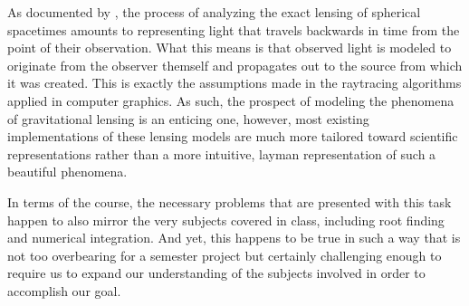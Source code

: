 \documentclass{standalone}
\begin{document}
As documented by \cite[Perlick]{gen_lens}, the process of analyzing the exact lensing of spherical spacetimes amounts to representing light that travels backwards in time from the point of their observation.
What this means is that observed light is modeled to originate from the observer themself and propagates out to the source from which it was created.
This is exactly the assumptions made in the raytracing algorithms applied in computer graphics.
As such, the prospect of modeling the phenomena of gravitational lensing is an enticing one, however, most existing implementations of these lensing models are much more tailored toward scientific representations rather than a more intuitive, layman representation of such a beautiful phenomena.

In terms of the course, the necessary problems that are presented with this task happen to also mirror the very subjects covered in class, including root finding and numerical integration.
And yet, this happens to be true in such a way that is not too overbearing for a semester project but certainly challenging enough to require us to expand our understanding of the subjects involved in order to accomplish our goal.
\end{document}
